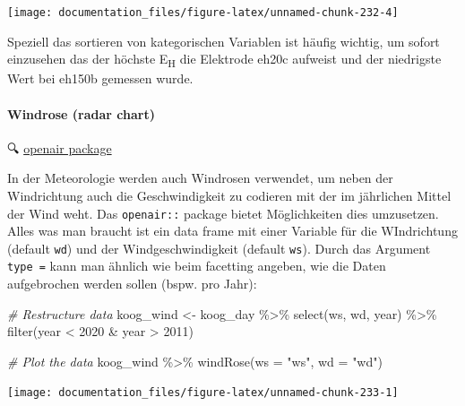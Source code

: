 \documentclass[
]{article}
\newenvironment{Shaded}{\begin{snugshade}}{\end{snugshade}}
\newcommand{\AttributeTok}[1]{\textcolor[rgb]{0.77,0.63,0.00}{#1}}
\newcommand{\CommentTok}[1]{\textcolor[rgb]{0.56,0.35,0.01}{\textit{#1}}}
\newcommand{\DecValTok}[1]{\textcolor[rgb]{0.00,0.00,0.81}{#1}}
\newcommand{\FunctionTok}[1]{\textcolor[rgb]{0.00,0.00,0.00}{#1}}
\newcommand{\NormalTok}[1]{#1}
\newcommand{\OtherTok}[1]{\textcolor[rgb]{0.56,0.35,0.01}{#1}}
\newcommand{\SpecialCharTok}[1]{\textcolor[rgb]{0.00,0.00,0.00}{#1}}
\newcommand{\StringTok}[1]{\textcolor[rgb]{0.31,0.60,0.02}{#1}}
\begin{document}
\begin{center}\texttt{[image: documentation\_files/figure-latex/unnamed-chunk-232-4]} \end{center}

Speziell das sortieren von kategorischen Variablen ist häufig wichtig, um sofort einzusehen das der höchste E\textsubscript{H} die Elektrode eh20c aufweist und der niedrigste Wert bei eh150b gemessen wurde.

\hypertarget{windrose-radar-chart}{%
\paragraph{Windrose (radar chart)}\label{windrose-radar-chart}}

🔍 \href{https://davidcarslaw.github.io/openair/reference/windRose.html}{openair package}

In der Meteorologie werden auch Windrosen verwendet, um neben der Windrichtung auch die Geschwindigkeit zu codieren mit der im jährlichen Mittel der Wind weht. Das \texttt{openair::} package bietet Möglichkeiten dies umzusetzen. Alles was man braucht ist ein data frame mit einer Variable für die WIndrichtung (default \texttt{wd}) und der Windgeschwindigkeit (default \texttt{ws}). Durch das Argument \texttt{type\ =} kann man ähnlich wie beim facetting angeben, wie die Daten aufgebrochen werden sollen (bspw. pro Jahr):

\begin{Shaded}
\begin{Highlighting}[]
\CommentTok{\# Restructure data}
\NormalTok{koog\_wind }\OtherTok{\textless{}{-}}\NormalTok{ koog\_day }\SpecialCharTok{\%\textgreater{}\%}
  \FunctionTok{select}\NormalTok{(ws, wd, year) }\SpecialCharTok{\%\textgreater{}\%}
  \FunctionTok{filter}\NormalTok{(year }\SpecialCharTok{\textless{}} \DecValTok{2020} \SpecialCharTok{\&}\NormalTok{ year }\SpecialCharTok{\textgreater{}} \DecValTok{2011}\NormalTok{)}

\CommentTok{\# Plot the data}
\NormalTok{koog\_wind }\SpecialCharTok{\%\textgreater{}\%}
  \FunctionTok{windRose}\NormalTok{(}\AttributeTok{ws =} \StringTok{"ws"}\NormalTok{, }\AttributeTok{wd =} \StringTok{"wd"}\NormalTok{)}
\end{Highlighting}
\end{Shaded}

\begin{center}\texttt{[image: documentation\_files/figure-latex/unnamed-chunk-233-1]} \end{center}
\end{document}
